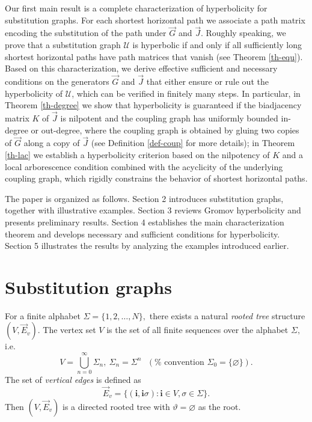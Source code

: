 \documentclass[reqno]{amsart}
\theoremstyle{plain}
\numberwithin{equation}{section}
\begin{document}
Our first main result is a complete characterization of hyperbolicity for
substitution graphs. For each shortest horizontal path we associate a path
matrix encoding the substitution of the path under $\overrightarrow{G}$ and $%
\overrightarrow{J}$. Roughly speaking, we prove that a substitution graph $%
\mathcal{U}$ is hyperbolic if and only if all sufficiently long shortest
horizontal paths have path matrices that vanish (see Theorem \ref{th-equ}).
Based on this characterization, we derive effective sufficient and necessary
conditions on the generators $\overrightarrow{G}$ and $\overrightarrow{J}$
that either ensure or rule out the hyperbolicity of $\mathcal{U}$, which can
be verified in finitely many steps. In particular, in Theorem \ref{th-degree}
we show that hyperbolicity is guaranteed if the biadjacency matrix $K$ of $%
\overrightarrow{J}$ is nilpotent and the coupling graph has uniformly
bounded in-degree or out-degree, where the coupling graph is obtained by
gluing two copies of $\overrightarrow{G}$ along a copy of $\overrightarrow{J}
$ (see Definition \ref{def-coup} for more details); in Theorem \ref{th-lac}
we establish a hyperbolicity criterion based on the nilpotency of $K$ and a
local arborescence condition combined with the acyclicity of the underlying
coupling graph, which rigidly constrains the behavior of shortest horizontal
paths.

The paper is organized as follows. Section 2 introduces substitution graphs,
together with illustrative examples. Section 3 reviews Gromov hyperbolicity
and presents preliminary results. Section 4 establishes the main
characterization theorem and develops necessary and sufficient conditions
for hyperbolicity. Section 5 illustrates the results by analyzing the
examples introduced earlier.

\bigskip

\section{Substitution graphs}

For a finite alphabet $\Sigma =\{1,2,\ldots ,N\},$ there exists a natural 
\emph{rooted tree} structure $(V,\overrightarrow{E}_{v})$. The vertex set $V$
is the set of all finite sequences over the alphabet $\Sigma ,$ i.e. 
\begin{equation*}
V=\bigcup_{n=0}^{\infty }\Sigma _{n},\ \Sigma _{n}=\Sigma ^{n}\text{ }(\text{%
convention }\Sigma _{0}=\{\varnothing \}).
\end{equation*}%
The set of \emph{vertical edges} is defined as 
\begin{equation*}
\overrightarrow{E}_{v}=\{(\mathbf{i},\mathbf{i}\sigma ):\mathbf{i}\in
V,\sigma \in \Sigma \}.
\end{equation*}%
Then $(V,\overrightarrow{E}_{v})$ is a directed rooted tree with $\vartheta
=\varnothing $ as the root.
\end{document}
